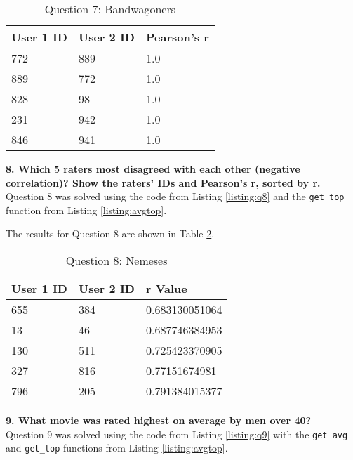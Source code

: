 \begin{table}[h!]
\centering
\begin{tabular}{| l | l | l |}
\hline
User 1 ID & User 2 ID & Pearson's r \\
\hline
772 & 889 & 1.0 \\
889 & 772 & 1.0 \\
828 & 98 & 1.0 \\
231 & 942 & 1.0 \\
846 & 941 & 1.0 \\
\hline
\end{tabular}
\caption{Question 7: Bandwagoners}
\label{tab:band}
\end{table}

\clearpage

\textbf{8. Which 5 raters most disagreed with each other (negative correlation)? Show the raters' IDs and Pearson's r, sorted by r.}\\

Question 8 was solved using the code from Listing \ref{listing:q8} and the {\tt get\_top} function from Listing \ref{listing:avgtop}.



The results for Question 8 are shown in Table \ref{tab:cont}.

\begin{table}[h!]
\centering
\begin{tabular}{| l | l | l |}
\hline
User 1 ID & User 2 ID & r Value \\
\hline
655 & 384 & 0.683130051064 \\
13 & 46 & 0.687746384953 \\
130 & 511 & 0.725423370905 \\
327 & 816 & 0.77151674981 \\
796 & 205 & 0.791384015377 \\
\hline
\end{tabular}
\caption{Question 8: Nemeses}
\label{tab:cont}
\end{table}

\textbf{9. What movie was rated highest on average by men over 40?}\\

Question 9 was solved using the code from Listing \ref{listing:q9} with the {\tt get\_avg} and {\tt get\_top} functions from Listing \ref{listing:avgtop}.



